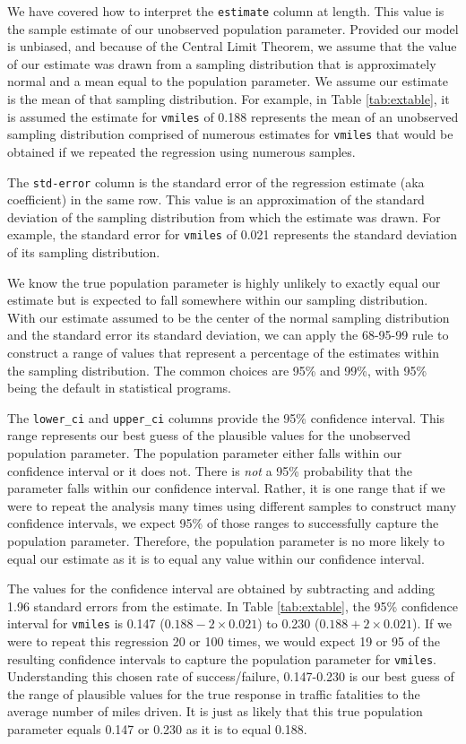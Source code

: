 \documentclass[
]{book}
\begin{document}
We have covered how to interpret the \texttt{estimate} column at length. This value is the sample estimate of our unobserved population parameter. Provided our model is unbiased, and because of the Central Limit Theorem, we assume that the value of our estimate was drawn from a sampling distribution that is approximately normal and a mean equal to the population parameter. We assume our estimate is the mean of that sampling distribution. For example, in Table \ref{tab:extable}, it is assumed the estimate for \texttt{vmiles} of 0.188 represents the mean of an unobserved sampling distribution comprised of numerous estimates for \texttt{vmiles} that would be obtained if we repeated the regression using numerous samples.

The \texttt{std-error} column is the standard error of the regression estimate (aka coefficient) in the same row. This value is an approximation of the standard deviation of the sampling distribution from which the estimate was drawn. For example, the standard error for \texttt{vmiles} of 0.021 represents the standard deviation of its sampling distribution.

We know the true population parameter is highly unlikely to exactly equal our estimate but is expected to fall somewhere within our sampling distribution. With our estimate assumed to be the center of the normal sampling distribution and the standard error its standard deviation, we can apply the 68-95-99 rule to construct a range of values that represent a percentage of the estimates within the sampling distribution. The common choices are 95\% and 99\%, with 95\% being the default in statistical programs.

The \texttt{lower\_ci} and \texttt{upper\_ci} columns provide the 95\% confidence interval. This range represents our best guess of the plausible values for the unobserved population parameter. The population parameter either falls within our confidence interval or it does not. There is \emph{not} a 95\% probability that the parameter falls within our confidence interval. Rather, it is one range that if we were to repeat the analysis many times using different samples to construct many confidence intervals, we expect 95\% of those ranges to successfully capture the population parameter. Therefore, the population parameter is no more likely to equal our estimate as it is to equal any value within our confidence interval.

The values for the confidence interval are obtained by subtracting and adding 1.96 standard errors from the estimate. In Table \ref{tab:extable}, the 95\% confidence interval for \texttt{vmiles} is 0.147 (\(0.188-2\times 0.021\)) to 0.230 (\(0.188+2\times 0.021\)). If we were to repeat this regression 20 or 100 times, we would expect 19 or 95 of the resulting confidence intervals to capture the population parameter for \texttt{vmiles}. Understanding this chosen rate of success/failure, 0.147-0.230 is our best guess of the range of plausible values for the true response in traffic fatalities to the average number of miles driven. It is just as likely that this true population parameter equals 0.147 or 0.230 as it is to equal 0.188.
\end{document}
